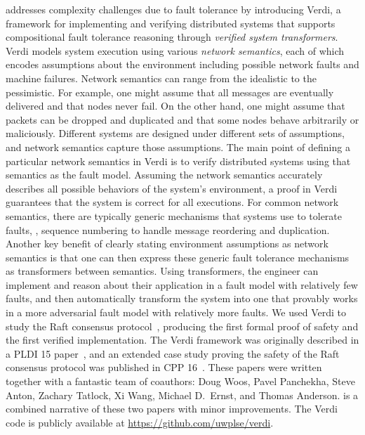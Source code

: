  addresses complexity challenges due to fault tolerance
  by introducing Verdi,
  a \Coq~\cite{Coq} framework for implementing and verifying distributed systems
  that supports compositional fault tolerance reasoning
  through \emph{verified system transformers}.
Verdi models system execution using various \emph{network semantics},
  each of which encodes assumptions about the environment
  including possible network faults and machine failures.
Network semantics can range from the idealistic to the pessimistic.
For example, one might assume that
  all messages are eventually delivered and that nodes never fail.
On the other hand, one might assume that
  packets can be dropped and duplicated and that
  some nodes behave arbitrarily or maliciously.
Different systems are designed under different sets of assumptions,
  and network semantics capture those assumptions.
The main point of defining a particular network semantics in Verdi is
  to verify distributed systems using that semantics as the fault model.
Assuming the network semantics accurately describes
  all possible behaviors of the system's environment,
  a proof in Verdi guarantees that the system is correct for all executions.
For common network semantics,
  there are typically generic mechanisms that systems use to tolerate faults,
  \eg, sequence numbering to handle message reordering and duplication.
Another key benefit of
  clearly stating environment assumptions as network semantics is that
  one can then express these generic fault tolerance mechanisms
  as transformers between semantics.
Using transformers, the engineer can
  implement and reason about their application
  in a fault model with relatively few faults, and
  then automatically transform the system into one
  that provably works in a more adversarial fault model
  with relatively more faults.
We used Verdi to study the Raft consensus protocol~\cite{ongaro:raft},
  producing the first formal proof of safety
  and the first verified implementation.
The Verdi framework was originally described in a PLDI 15 paper~\cite{Wilcox-al:PLDI15},
  and an extended case study proving
  the safety of the Raft consensus protocol was published in CPP 16~\cite{Woos-al:CPP16}.
These papers were written together with a fantastic team of coauthors:
  Doug Woos, Pavel Panchekha, Steve Anton, Zachary Tatlock, Xi Wang, Michael D.\ Ernst, and Thomas Anderson.
 is a combined narrative of these two papers with minor improvements.
The Verdi code is publicly available at \url{https://github.com/uwplse/verdi}.

